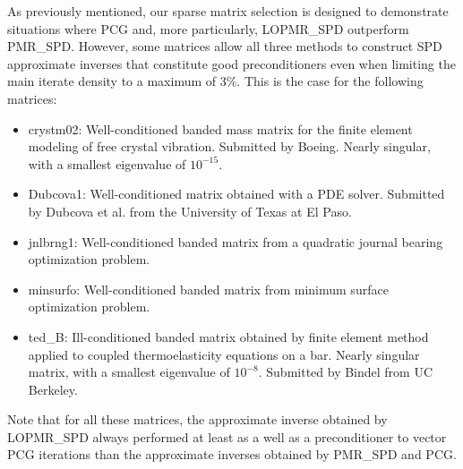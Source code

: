 \documentclass[numbers,webpdf,imanum]{ima-authoring-template}%
\theoremstyle{thmstyletwo}%
\numberwithin{equation}{section}
\begin{document}
As previously mentioned, our sparse matrix selection is designed to demonstrate situations where PCG and, more particularly, LOPMR\_SPD outperform PMR\_SPD. 
However, some matrices allow all three methods to construct SPD approximate inverses that constitute good preconditioners even when limiting the main iterate density to a maximum of 3\%. 
This is the case for the following matrices:
\begin{itemize}
\item[-] crystm02\footnotemark[2]: Well-conditioned banded mass matrix for the finite element modeling of free crystal vibration.
Submitted by Boeing.
Nearly singular, with a smallest eigenvalue of $10^{-15}$.
\item[-] Dubcova1\footnotemark[2]: Well-conditioned matrix obtained with a PDE solver.
Submitted by Dubcova et al. from the University of Texas at El Paso.
\item[-] jnlbrng1\footnotemark[2]: Well-conditioned banded matrix from a quadratic journal bearing optimization problem.
\item[-] minsurfo\footnotemark[2]: Well-conditioned banded matrix from minimum surface optimization problem.
\item[-] ted\_B\footnotemark[2]: Ill-conditioned banded matrix obtained by finite element method applied to coupled thermoelasticity equations on a bar.
Nearly singular matrix, with a smallest eigenvalue of $10^{-8}$.
Submitted by Bindel from UC Berkeley.
\end{itemize}
Note that for all these matrices, the approximate inverse obtained by LOPMR\_SPD always performed at least as a well as a preconditioner to vector PCG iterations than the approximate inverses obtained by PMR\_SPD and PCG.
\end{document}
